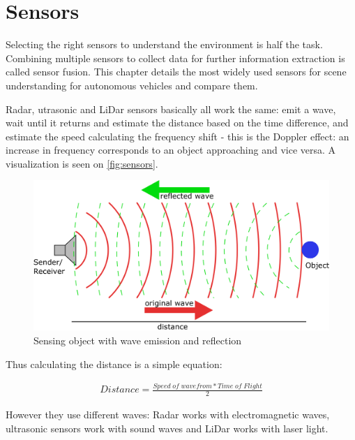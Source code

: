 \chapter{Sensors}
\label{chap:sensors}

Selecting the right sensors to understand the environment is half the task.
Combining multiple sensors to collect data for further information extraction is
called sensor fusion. This chapter details the most widely used sensors for
scene understanding for autonomous vehicles and compare them. 

Radar, utrasonic and LiDar sensors basically all work the same: emit a wave,
wait until it returns and estimate the distance based on the time difference,
and estimate the speed calculating the frequency shift - this is the Doppler
effect: an increase in frequency corresponds to an object approaching and vice
versa. A visualization is seen on \autoref{fig:sensors}.

\begin{figure}[!ht]
    \centering
    \includegraphics[width=150mm, keepaspectratio]{figures/sensors.png}
    \caption{Sensing object with wave emission and reflection}
    \label{fig:sensors}
\end{figure}

Thus calculating the distance is a simple equation:

\begin{align}
    Distance=\frac{Speed\; of\; wavefrom * Time\; of\; Flight}{2}
\end{align}

However they use different waves: Radar works with electromagnetic waves,
ultrasonic sensors work with sound waves and LiDar works with laser light.

